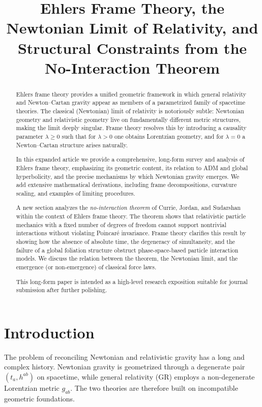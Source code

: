 \documentclass[12pt]{article}
\title{\bf 
Ehlers Frame Theory, the Newtonian Limit of Relativity, 
and Structural Constraints from the No-Interaction Theorem
}
\author{}
\date{}
\begin{document}
\maketitle

\begin{abstract}
Ehlers frame theory provides a unified geometric framework in which
general relativity and Newton--Cartan gravity appear as members of a 
parametrized family of spacetime theories.
The classical (Newtonian) limit of relativity is notoriously subtle:
Newtonian geometry and relativistic geometry live on fundamentally 
different metric structures, making the limit deeply singular.
Frame theory resolves this by introducing a causality parameter 
$\lambda \ge 0$ such that 
for $\lambda>0$ one obtains Lorentzian geometry, and for $\lambda=0$
a Newton--Cartan structure arises naturally.

In this expanded article we provide a comprehensive, long-form survey 
and analysis of Ehlers frame theory, emphasizing its geometric content, 
its relation to ADM and global hyperbolicity, and the precise mechanisms
by which Newtonian gravity emerges.
We add extensive mathematical derivations, including frame decompositions, 
curvature scaling, and examples of limiting procedures.

A new section analyzes the 
{\it no-interaction theorem} of Currie, Jordan, and Sudarshan 
within the context of Ehlers frame theory.
The theorem shows that 
relativistic particle mechanics with a fixed number of degrees of freedom 
cannot support nontrivial interactions without violating Poincaré invariance.
Frame theory clarifies this result by showing how 
the absence of absolute time, the degeneracy of simultaneity, 
and the failure of a global foliation structure obstruct 
phase-space-based particle interaction models.
We discuss the relation between the theorem, the Newtonian limit, 
and the emergence (or non-emergence) of classical force laws.

This long-form paper is intended as a high-level research exposition 
suitable for journal submission after further polishing.
\end{abstract}

\tableofcontents

\section{Introduction}

The problem of reconciling Newtonian and relativistic gravity has a long and 
complex history.
Newtonian gravity is geometrized through a degenerate pair 
$(t_a, h^{ab})$ on spacetime, while general relativity (GR) 
employs a non-degenerate Lorentzian metric $g_{ab}$.
The two theories are therefore built on incompatible geometric foundations.
\end{document}
